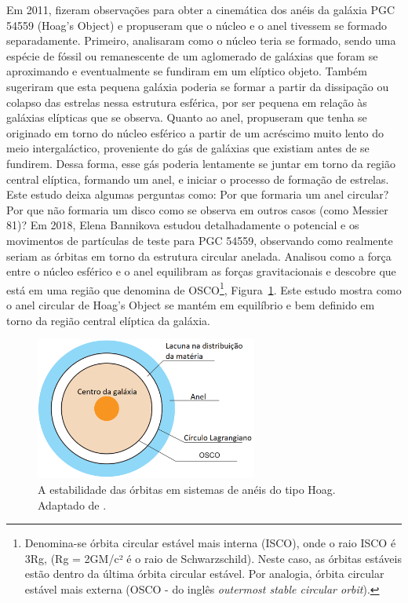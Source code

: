 Em 2011,  fizeram observações para obter a cinemática dos anéis da galáxia PGC 54559 (Hoag's Object) e propuseram que o núcleo e o anel tivessem se formado separadamente. Primeiro, analisaram como o núcleo teria se formado, sendo uma espécie de fóssil ou remanescente de um aglomerado de galáxias que foram se aproximando e eventualmente se fundiram em um elíptico objeto. Também sugeriram que esta pequena galáxia poderia se formar a partir da dissipação ou colapso das estrelas nessa estrutura esférica, por ser pequena em relação às galáxias elípticas que se observa. Quanto ao anel, propuseram que tenha se originado em torno do núcleo esférico a partir de um acréscimo muito lento do meio intergaláctico, proveniente do gás de galáxias que existiam antes de se fundirem. Dessa forma, esse gás poderia lentamente se juntar em torno da região central elíptica, formando um anel, e iniciar o processo de formação de estrelas. Este estudo deixa algumas perguntas como: Por que formaria um anel circular? Por que não formaria um disco como se observa em outros casos (como Messier 81)? Em 2018, Elena Bannikova estudou detalhadamente o potencial e os movimentos de partículas de teste para PGC 54559, observando como realmente seriam as órbitas em torno da estrutura circular anelada. Analisou como a força entre o núcleo esférico e o anel equilibram as forças gravitacionais e descobre que está em uma região que denomina de OSCO\footnote{Denomina-se órbita circular estável mais interna (ISCO), onde o raio ISCO é 3Rg, (Rg = 2GM/c² é o raio de Schwarzschild). Neste caso, as órbitas estáveis estão dentro da última órbita circular estável. Por analogia, órbita circular estável mais externa (OSCO - do inglês \emph{outermost stable circular orbit}).}, Figura~\ref{fig:osco}. Este estudo mostra como o anel circular de Hoag's Object se mantém em equilíbrio e bem definido em torno da região central elíptica da galáxia.

\begin{figure}[h]
  \centering 
  \includegraphics[width=0.65\textwidth]{Imagens/innerring.PNG} 
  \caption[Estabilidade das órbitas em sistemas de anéis do tipo Hoag.]{A estabilidade das órbitas em sistemas de anéis do tipo Hoag. Adaptado de \cite{2018MNRAS.476.3269B}.}
  \label{fig:osco} 
\end{figure}

